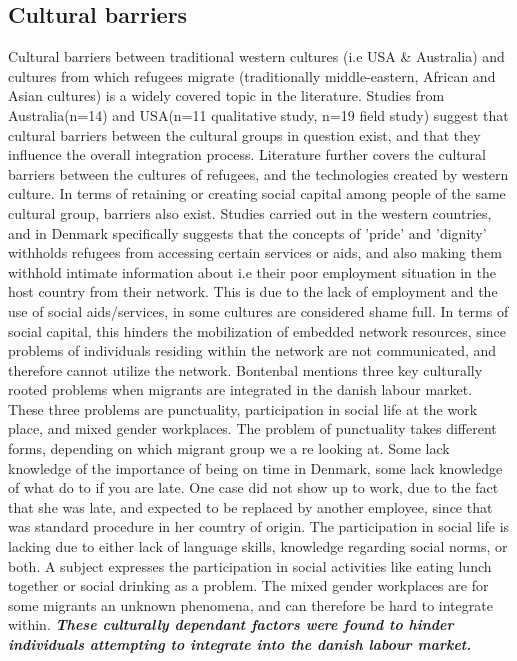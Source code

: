 \subsection{Cultural barriers}

Cultural barriers between traditional western cultures (i.e USA \& Australia) and cultures from which refugees migrate (traditionally middle-eastern, African and Asian cultures) is a widely covered topic in the literature. Studies from Australia\cite{Almohamed}(n=14) and USA\cite{Brown2016}(n=11 qualitative study, n=19 field study) suggest that cultural barriers between the cultural groups in question exist, and that they influence the overall integration process. Literature further covers the cultural barriers between the cultures of refugees, and the technologies created by western culture\cite{Almohamamed2018}. In terms of retaining or creating social capital among people of the same cultural group, barriers also exist. Studies carried out in the western countries, and in Denmark specifically suggests that the concepts of 'pride' and 'dignity' withholds refugees from accessing certain services or aids, and also making them withhold intimate information about i.e their poor employment situation in the host country from their network\cite{Sirius}. This is due to the lack of employment and the use of social aids/services, in some cultures are considered shame full\cite{Brown2016}. In terms of social capital, this hinders the mobilization of embedded network resources, since problems of individuals residing within the network are not communicated, and therefore cannot utilize the network. Bontenbal\cite{Bontenbal2019} mentions three key culturally rooted problems when migrants are integrated in the danish labour market. These three problems are punctuality, participation in social life at the work place, and mixed gender workplaces. The problem of punctuality takes different forms, depending on which migrant group we a re looking at. Some lack knowledge of the importance of being on time in Denmark, some lack knowledge of what do to if you are late. One case did not show up to work, due to the fact that she was late, and expected to be replaced by another employee, since that was standard procedure in her country of origin. The participation in social life is lacking due to either lack of language skills, knowledge regarding social norms, or both. A subject expresses the participation in social activities like eating lunch together or social drinking as a problem. The mixed gender workplaces are for some migrants an unknown phenomena, and can therefore be hard to integrate within. \textbf{\emph{These culturally dependant factors were found to hinder individuals attempting to integrate into the danish labour market.}}


